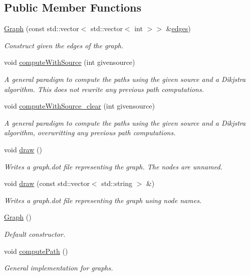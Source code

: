 \subsection*{Public Member Functions}
\begin{DoxyCompactItemize}
\item 
\hyperlink{classMackey_1_1Graph_a4f0ca7cec28645835bbad29b8c00992c}{Graph} (const std\+::vector$<$ std\+::vector$<$ int $>$$>$ \&\hyperlink{classMackey_1_1Graph_a729ec24b9f9e504f4c4e2d3f6e2cab83}{edges})
\begin{DoxyCompactList}\small\item\em Construct given the edges of the graph. \end{DoxyCompactList}\item 
void \hyperlink{classMackey_1_1Graph_acda32cd8d144dcd1ec771bd8d2753321}{compute\+With\+Source} (int givensource)
\begin{DoxyCompactList}\small\item\em A general paradigm to compute the paths using the given source and a Dikjstra algorithm. This does not rewrite any previous path computations. \end{DoxyCompactList}\item 
void \hyperlink{classMackey_1_1Graph_a769966fd9422efb15a53db185a8be278}{compute\+With\+Source\+\_\+clear} (int givensource)
\begin{DoxyCompactList}\small\item\em A general paradigm to compute the paths using the given source and a Dikjstra algorithm, overwritting any previous path computations. \end{DoxyCompactList}\item 
void \hyperlink{classMackey_1_1Graph_ab88d38f2fa1822d415ce7dac272b32dc}{draw} ()
\begin{DoxyCompactList}\small\item\em Writes a graph.\+dot file representing the graph. The nodes are unnamed. \end{DoxyCompactList}\item 
void \hyperlink{classMackey_1_1Graph_a63aa485ca7838f3dc66da1749e09cd84}{draw} (const std\+::vector$<$ std\+::string $>$ \&)
\begin{DoxyCompactList}\small\item\em Writes a graph.\+dot file representing the graph using node names. \end{DoxyCompactList}\item 
\hyperlink{classMackey_1_1Graph_a910e6687de1a1a90df5b656e3c850a01}{Graph} ()
\begin{DoxyCompactList}\small\item\em Default constructor. \end{DoxyCompactList}\item 
void \hyperlink{classMackey_1_1Graph_a204323cc824bac6c4d393284900f152b}{compute\+Path} ()
\begin{DoxyCompactList}\small\item\em General implementation for graphs. \end{DoxyCompactList}\end{DoxyCompactItemize}
